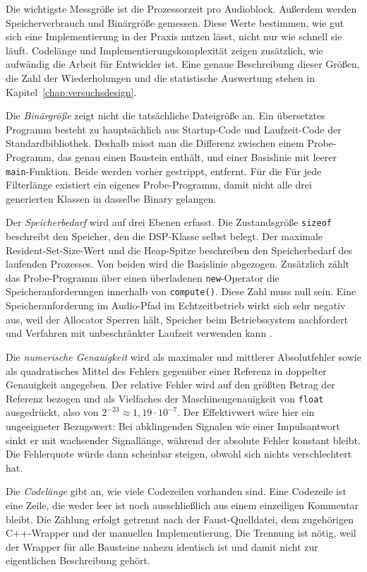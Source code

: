 Die wichtigste Messgröße ist die Prozessorzeit pro Audioblock. Außerdem werden Speicherverbrauch und Binärgröße gemessen. Diese Werte bestimmen, wie gut sich eine Implementierung in der Praxis nutzen lässt, nicht nur wie schnell sie läuft. Codelänge und Implementierungskomplexität zeigen zusätzlich, wie aufwändig die Arbeit für Entwickler ist. Eine genaue Beschreibung dieser Größen, die Zahl der Wiederholungen und die statistische Auswertung stehen in Kapitel~\ref{chap:versuchsdesign}.

Die \emph{Binärgröße} zeigt nicht die tatsächliche Dateigröße an. Ein
übersetztes Programm besteht zu hauptsächlich aus Startup-Code und Laufzeit-Code der
Standardbibliothek. Deshalb misst man die Differenz zwischen einem
Probe-Programm, das genau einen Baustein enthält, und einer Basislinie mit
leerer \texttt{main}-Funktion. Beide werden vorher gestrippt, entfernt. Für die
Für jede Filterlänge existiert ein eigenes Probe-Programm, damit nicht
alle drei generierten Klassen in dasselbe Binary gelangen.

Der \emph{Speicherbedarf} wird auf drei Ebenen erfasst. Die Zustandsgröße
\texttt{sizeof} beschreibt den Speicher, den die DSP-Klasse selbst belegt. Der
maximale Resident-Set-Size-Wert und die Heap-Spitze beschreiben den
Speicherbedarf des laufenden Prozesses. Von beiden wird die Basislinie
abgezogen. Zusätzlich zählt das Probe-Programm über einen überladenen
\texttt{new}-Operator die Speicheranforderungen innerhalb von
\texttt{compute()}. Diese Zahl muss null sein. Eine Speicheranforderung im Audio-Pfad im Echtzeitbetrieb wirkt sich sehr negativ aus, weil der Allocator Sperren hält, Speicher beim Betriebssystem nachfordert und Verfahren mit unbeschränkter Laufzeit verwenden kann \parencite{buttazzo1997hard}.

Die \emph{numerische Genauigkeit} wird als maximaler und mittlerer
Absolutfehler sowie als quadratisches Mittel des Fehlers gegenüber einer
Referenz in doppelter Genauigkeit angegeben. Der relative Fehler wird auf den
größten Betrag der Referenz bezogen und als Vielfaches der
Maschinengenauigkeit von \texttt{float} ausgedrückt, also von
$2^{-23} \approx 1{,}19 \cdot 10^{-7}$. Der Effektivwert wäre hier ein
ungeeigneter Bezugswert: Bei abklingenden Signalen wie einer Impulsantwort
sinkt er mit wachsender Signallänge, während der absolute Fehler konstant
bleibt. Die Fehlerquote würde dann scheinbar steigen, obwohl sich nichts
verschlechtert hat.

Die \emph{Codelänge} gibt an, wie viele Codezeilen vorhanden sind. Eine Codezeile ist
eine Zeile, die weder leer ist noch ausschließlich aus einem einzeiligen
Kommentar bleibt. Die Zählung erfolgt getrennt nach der Faust-Quelldatei, dem
zugehörigen C++-Wrapper und der manuellen Implementierung. Die Trennung ist
nötig, weil der Wrapper für alle Bausteine nahezu identisch ist und damit
nicht zur eigentlichen Beschreibung gehört.

